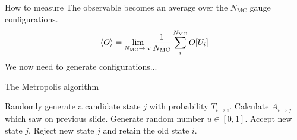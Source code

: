 \documentclass[10pt,show notes on second screen]{beamer}
\begin{document}
\begin{frame}{How to measure}
The observable becomes an average over the $N_\mathrm{MC}$ gauge configurations.
\begin{align*}
    \left\langle{O}\right\rangle = \underset{N_\mathrm{MC}\rightarrow\infty}{\lim} \frac{1}{N_\mathrm{MC}} \sum^{N_\mathrm{MC}}_i O[U_i]
\end{align*}
We now need to generate configurations...
\end{frame}

\begin{frame}{The Metropolis algorithm}
\begin{algorithmic}
    \Repeat
        \State Randomly generate a candidate state $j$ with probability $T_{i\rightarrow i}$.
        \State Calculate $A_{i\rightarrow j}$ which saw on previous slide.
        \State Generate random number $u\in[0,1]$.
            \State Accept new state $j$.
            \State Reject new state $j$ and retain the old state $i$.
        \EndIf
\end{algorithmic}
\end{frame}
\end{document}
